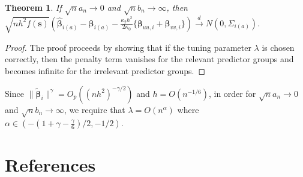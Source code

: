 \documentclass[authoryear, review, 11pt]{elsarticle}
\newtheorem{theorem}{Theorem}[section]
\begin{document}
    \begin{theorem}
      If $\sqrt{n} a_n \to 0$ and $\sqrt{n} b_n \to \infty$, then $\sqrt{n h^2 f(\bm{s})} \left( \hat{\bm{\beta}}_{i(a)} - \bm{\beta}_{i(a)} - \frac{\kappa_2 h^2}{2 \kappa_0} \{ \bm{\beta}_{uu,i} + \bm{\beta}_{vv,i} \} \right) \xrightarrow{d} N(0,\Sigma_{i(a)})$.
    \end{theorem}

    \begin{proof}
      The proof proceeds by showing that if the tuning parameter $\lambda$ is chosen correctly, then the penalty term vanishes for the relevant predictor groups and becomes infinite for the irrelevant predictor groups.

    \end{proof}

    Since $ \| \tilde{\bm{\beta}}_{i} \|^{\gamma} = O_p\left( ( n h^2 )^{-\gamma / 2} \right) $ and $h = O(n^{-1/6})$, in order for $\sqrt{n} a_n \to 0$ and $\sqrt{n} b_n \to \infty$, we require that $\lambda = O(n^{\alpha})$ where $\alpha \in \left( -(1 + \gamma - \frac{\gamma}{6})/2, -1/2 \right) $.

\section{References}


\end{document}
